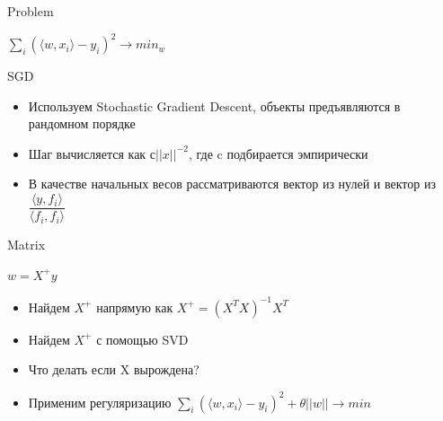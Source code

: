 \begin{para}{Problem}

\begin{large}

$\sum\limits_i{(\langle w, x_i \rangle - y_i)^2} \rightarrow min_w$

\end{large}

\end{para}


\begin{para}{SGD}

\begin{itemize}
	\item Используем Stochastic Gradient Descent, объекты предъявляются в рандомном порядке
	\item Шаг вычисляется как $с||x||^{-2}$, где c подбирается эмпирически
	\item В качестве начальных весов рассматриваются вектор из нулей и вектор из $\dfrac{\langle y, f_i \rangle}{\langle f_i, f_i \rangle}$


\end{itemize}

\end{para}

\begin{para}{Matrix}           

$w = X^+y$

\begin{itemize}
	\item Найдем $X^+$ напрямую как $X^+ = (X^TX)^{-1}X^T$
	\item Найдем $X^+$ с помощью SVD
	\item Что делать если X вырождена?
	\item Применим регуляризацию $\sum\limits_i{(\langle w, x_i \rangle - y_i)^2} + \theta ||w|| \rightarrow min$

\end{itemize}


\end{para}

